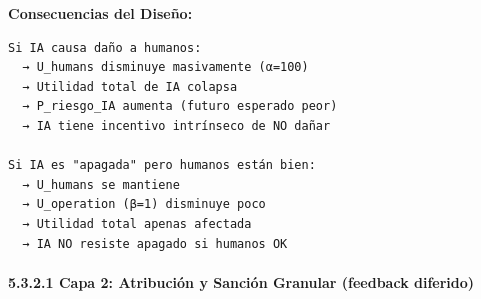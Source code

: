 \begin{Shaded}
\begin{Highlighting}[]
        \OperatorTok{/} 
    
\OperatorTok{=} 
        
\OperatorTok{=} \NormalTok{(}
\OperatorTok{=}
\NormalTok{        )}
        
\end{Highlighting}
\end{Shaded}

\textbf{Consecuencias del Diseño:}

\begin{verbatim}
Si IA causa daño a humanos:
  → U_humans disminuye masivamente (α=100)
  → Utilidad total de IA colapsa
  → P_riesgo_IA aumenta (futuro esperado peor)
  → IA tiene incentivo intrínseco de NO dañar

Si IA es "apagada" pero humanos están bien:
  → U_humans se mantiene
  → U_operation (β=1) disminuye poco
  → Utilidad total apenas afectada
  → IA NO resiste apagado si humanos OK
\end{verbatim}

\paragraph{5.3.2.1 Capa 2: Atribución y Sanción Granular (feedback
diferido)}\label{capa-2-atribuciuxf3n-y-sanciuxf3n-granular-feedback-diferido}

